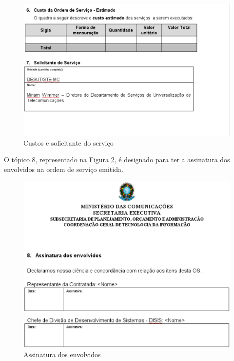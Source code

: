 \begin{figure}[H]
  \centering
  \includegraphics[keepaspectratio=true,scale=0.5]{figures/pt6_7}
  \caption{Custos e solicitante do serviço \label{fig:pt6_7}}
\end{figure}

O tópico 8, representado na Figura \ref{fig:pt8}, é designado para ter a assinatura
dos envolvidos na ordem de serviço emitida.

\begin{figure}[H]
  \centering
  \includegraphics[keepaspectratio=true,scale=0.5]{figures/pt8}
  \caption{Assinatura dos envolvidos \label{fig:pt8}}
\end{figure}